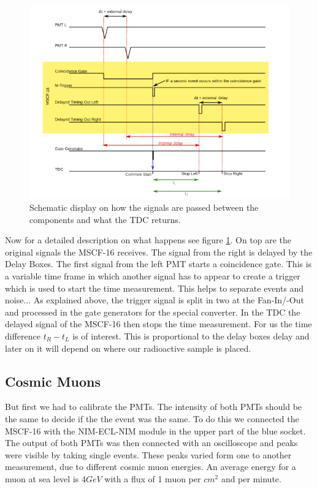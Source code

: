 \documentclass[]{article}
\begin{document}
\begin{figure}[H]
\centering
\includegraphics[width=1\textwidth]{Plots/Timing.png}
\caption{Schematic display on how the signals are passed between the components and what the TDC returns. \cite{script}}
\label{fig:timing}
\end{figure}

Now for a detailed description on what happens see figure \ref{fig:timing}. On top are the original signals the MSCF-16 receives. The signal from the right is delayed by the Delay Boxes. The first signal from the left PMT starts a coincidence gate. This is a variable time frame in which another signal has to appear to create a trigger which is used to start the time measurement. This helps to separate events and noise...
As explained above, the trigger signal is split in two at the Fan-In/-Out and processed in the gate generators for the special converter. In the TDC the delayed signal of the MSCF-16 then stops the time measurement. For us the time difference $t_R - t_L$ is of interest. This is proportional to the delay boxes delay and later on it will depend on where our radioactive sample is placed.

\subsection{Cosmic Muons} %
But first we had to calibrate the PMTs. The intensity of both PMTs should be the same to decide if the the event was the same. To do this we connected the MSCF-16 with the NIM-ECL-NIM module in the upper part of the blue socket. The output of both PMTs was then connected with an oscilloscope and peaks were visible by taking single events. These peaks varied form one to another measurement, due to different cosmic muon energies. An average energy for a muon at sea level is $4GeV$ with a flux of 1 muon per $cm^2$ and per minute. \cite{muon}
\end{document}
